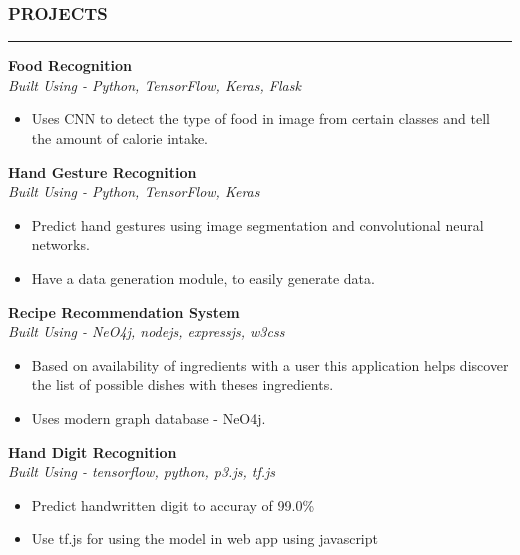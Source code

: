 \documentclass[a4paper]{article}
\begin{document}
\subsubsection*{PROJECTS}
\hrule
\vspace{10pt}

\noindent
\textbf{Food Recognition} \\
\textit{Built Using - Python, TensorFlow, Keras, Flask}
\begin{itemize} [leftmargin=*, nosep]
    \item Uses CNN to detect the type of food in image from certain classes and tell the amount of calorie intake.
\end{itemize}

\vspace{10pt}
\noindent
\textbf{Hand Gesture Recognition} \\
\textit{Built Using - Python, TensorFlow, Keras}
\begin{itemize} [leftmargin=*, nosep]
    \item Predict hand gestures using image segmentation and convolutional neural networks.
    \item Have a data generation module, to easily generate data.
\end{itemize}

\vspace{10pt}
\noindent
\textbf{Recipe Recommendation System} \\
\textit{Built Using - NeO4j, nodejs, expressjs, w3css}
\begin{itemize}[leftmargin=*, nosep]
    \item Based on availability of ingredients with a user this application
          helps discover the list of possible dishes with theses ingredients.
    \item Uses modern graph database - NeO4j.
\end{itemize}

\vspace{10pt}
\noindent
\textbf{Hand Digit Recognition} \\
\textit{Built Using - tensorflow, python, p3.js, tf.js}
\begin{itemize}[leftmargin=*, nosep]
    \item Predict handwritten digit to accuray of 99.0\%
    \item Use tf.js for using the model in web app using javascript
\end{itemize}
\end{document}
